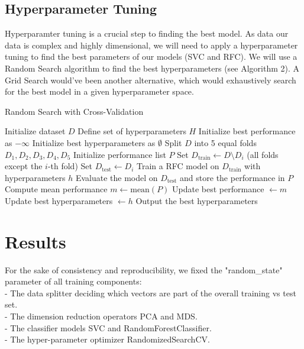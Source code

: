 \documentclass[twocolumn]{article}
\begin{document}
\subsection{Hyperparameter Tuning}
Hyperparamter tuning is a crucial step to finding the best model. As data our data is complex and highly dimensional, we will need to apply a hyperparameter tuning to find the best parameters of our models (SVC and RFC). We will use a Random Search algorithm to find the best hyperparameters (see Algorithm 2). A Grid Search would've been another alternative, which would exhaustively search for the best model in a given hyperparameter space.   

\newpage

\begin{algorithm}[!h]
\caption{Random Search with Cross-Validation}
\begin{algorithmic}[1]
\State Initialize dataset $D$
\State Define set of hyperparameters $H$
\State Initialize best performance as $-\infty$
\State Initialize best hyperparameters as $\emptyset$
    \State Split $D$ into 5 equal folds $D_1, D_2, D_3, D_4, D_5$
    \State Initialize performance list $P$
        \State Set $D_{\text{train}} \gets D \setminus D_i$ (all folds except the $i$-th fold)
        \State Set $D_{\text{test}} \gets D_i$
        \State Train a RFC model on $D_{\text{train}}$ with hyperparameters $h$
        \State Evaluate the model on $D_{\text{test}}$ and store the performance in $P$
    \EndFor
    \State Compute mean performance $m \gets \text{mean}(P)$
        \State Update best performance $ \gets m$
        \State Update best hyperparameters $\gets h$
    \EndIf
\EndFor
\State Output the best hyperparameters
\end{algorithmic}
\end{algorithm}

\newpage

\section{Results}
For the sake of consistency and reproducibility, we fixed the "random\_state" parameter of all training components: \\
- The data splitter deciding which vectors are part of the overall training vs test set. \\
- The dimension reduction operators PCA and MDS. \\
- The classifier models SVC and RandomForestClassifier. \\
- The hyper-parameter optimizer RandomizedSearchCV.
\end{document}
